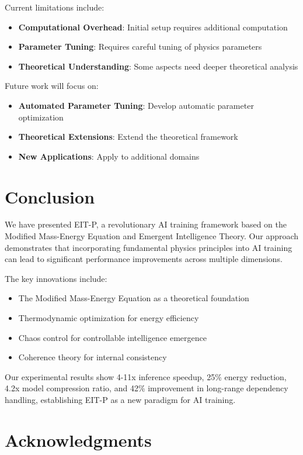 \documentclass[12pt]{article}
\begin{document}
Current limitations include:

\begin{itemize}
\item \textbf{Computational Overhead}: Initial setup requires additional computation
\item \textbf{Parameter Tuning}: Requires careful tuning of physics parameters
\item \textbf{Theoretical Understanding}: Some aspects need deeper theoretical analysis
\end{itemize}

Future work will focus on:

\begin{itemize}
\item \textbf{Automated Parameter Tuning}: Develop automatic parameter optimization
\item \textbf{Theoretical Extensions}: Extend the theoretical framework
\item \textbf{New Applications}: Apply to additional domains
\end{itemize}

\section{Conclusion}

We have presented EIT-P, a revolutionary AI training framework based on the Modified Mass-Energy Equation and Emergent Intelligence Theory. Our approach demonstrates that incorporating fundamental physics principles into AI training can lead to significant performance improvements across multiple dimensions.

The key innovations include:
\begin{itemize}
\item The Modified Mass-Energy Equation as a theoretical foundation
\item Thermodynamic optimization for energy efficiency
\item Chaos control for controllable intelligence emergence
\item Coherence theory for internal consistency
\end{itemize}

Our experimental results show 4-11x inference speedup, 25\% energy reduction, 4.2x model compression ratio, and 42\% improvement in long-range dependency handling, establishing EIT-P as a new paradigm for AI training.

\section*{Acknowledgments}
\end{document}
